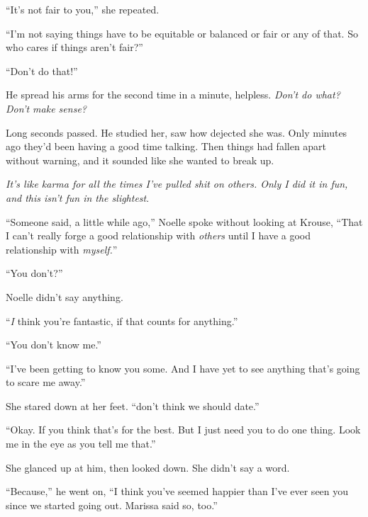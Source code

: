 ``It's not fair to you,'' she repeated.



``I'm not saying things have to be equitable or balanced or fair or any of that.  So who cares if things aren't fair?''



``Don't do that!''



He spread his arms for the second time in a minute, helpless.  \emph{Don't do what?}\emph{Don't make sense?}



Long seconds passed.  He studied her, saw how dejected she was.  Only minutes ago they'd been having a good time talking.  Then things had fallen apart without warning, and it sounded like she wanted to break up.



\emph{It's like karma for all the times I've pulled shit on others.  Only I did it in fun, and this isn't fun in the slightest}.



``Someone said, a little while ago,'' Noelle spoke without looking at Krouse, ``That I can't really forge a good relationship with \emph{others} until I have a good relationship with \emph{myself.}''



``You don't?''



Noelle didn't say anything.



``\emph{I} think you're fantastic, if that counts for anything.''



``You don't know me.''



``I've been getting to know you some.  And I have yet to see anything that's going to scare me away.''



She stared down at her feet.  ``\ldotsI don't think we should date.''



``Okay.  If you think that's for the best.  But I just need you to do one thing.  Look me in the eye as you tell me that.''



She glanced up at him, then looked down.  She didn't say a word.



``Because,'' he went on, ``I think you've seemed happier than I've ever seen you since we started going out.  Marissa said so, too.''



